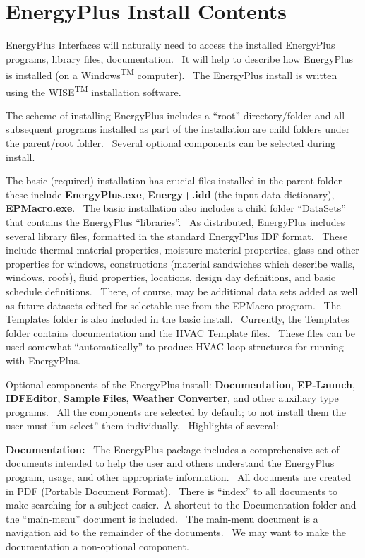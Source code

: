 \chapter{EnergyPlus Install Contents}\label{energyplus-install-contents}

EnergyPlus Interfaces will naturally need to access the installed EnergyPlus programs, library files, documentation.~ It will help to describe how EnergyPlus is installed (on a Windows\textsuperscript{TM} computer).~ The EnergyPlus install is written using the WISE\textsuperscript{TM} installation software.

The scheme of installing EnergyPlus includes a ``root'' directory/folder and all subsequent programs installed as part of the installation are child folders under the parent/root folder.~ Several optional components can be selected during install.

The basic (required) installation has crucial files installed in the parent folder -- these include \textbf{EnergyPlus.exe}, \textbf{Energy+.idd} (the input data dictionary), \textbf{EPMacro.exe}.~ The basic installation also includes a child folder ``DataSets'' that contains the EnergyPlus ``libraries''.~ As distributed, EnergyPlus includes several library files, formatted in the standard EnergyPlus IDF format.~ These include thermal material properties, moisture material properties, glass and other properties for windows, constructions (material sandwiches which describe walls, windows, roofs), fluid properties, locations, design day definitions, and basic schedule definitions.~ There, of course, may be additional data sets added as well as future datasets edited for selectable use from the EPMacro program.~ The Templates folder is also included in the basic install.~ Currently, the Templates folder contains documentation and the HVAC Template files.~ These files can be used somewhat ``automatically'' to produce HVAC loop structures for running with EnergyPlus.

Optional components of the EnergyPlus install: \textbf{Documentation}, \textbf{EP-Launch}, \textbf{IDFEditor}, \textbf{Sample} \textbf{Files}, \textbf{Weather} \textbf{Converter}, and other auxiliary type programs.~ All the components are selected by default; to not install them the user must ``un-select'' them individually.~ Highlights of several:

\textbf{Documentation:}~ The EnergyPlus package includes a comprehensive set of documents intended to help the user and others understand the EnergyPlus program, usage, and other appropriate information.~ All documents are created in PDF (Portable Document Format).~ There is ``index'' to all documents to make searching for a subject easier.~A shortcut to the Documentation folder and the ``main-menu'' document is included.~ The main-menu document is a navigation aid to the remainder of the documents.~ We may want to make the documentation a non-optional component.

